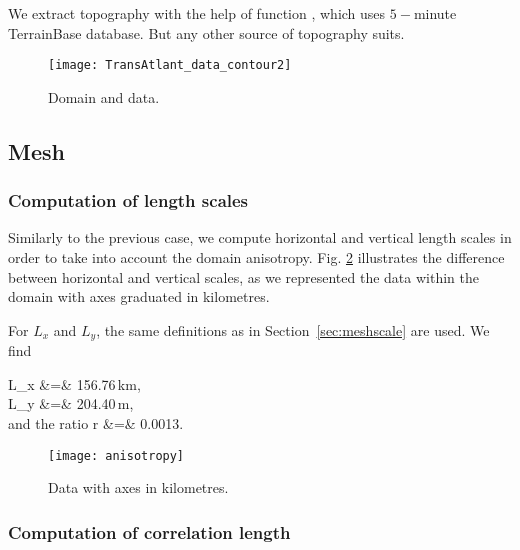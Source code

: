 We extract topography with the help of \matlab function  , which uses $5-$minute TerrainBase database. But any other source of topography suits.
				
\begin{figure}[H]
\centering
\texttt{[image: TransAtlant\_data\_contour2]}
\caption{Domain and data.\label{fig:domaindata}}
\end{figure}


%
%

\subsection{Mesh} 

\subsubsection{Computation of length scales}

Similarly to the previous case, we compute horizontal and vertical length scales in order to take into account the domain anisotropy. Fig. \ref{fig:anisotropy} illustrates the difference between horizontal and vertical scales, as we represented the data within the domain with axes graduated in kilometres.

For $L_x$ and $L_y$, the same definitions as in Section~\ref{sec:meshscale} are used. We find

\beqn
L_x &=& 156.76\,km, \\
L_y &=& 204.40\,m, \\
\textrm{and the ratio\qquad} r &=&  0.0013.
\eeqn

\begin{figure}[htpb]
\centering
\texttt{[image: anisotropy]}
\caption{Data with axes in kilometres.\label{fig:anisotropy}}
\end{figure}



\subsubsection{Computation of correlation length}

